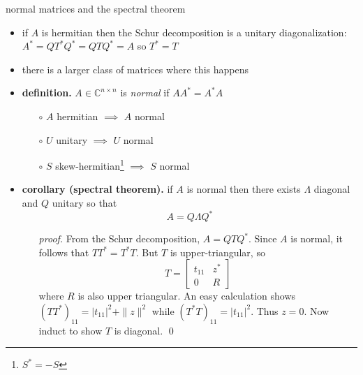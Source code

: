 \documentclass[10pt,hyperref]{beamer}
\newcommand{\CC}{\mathbb{C}}
\newcommand{\blocktwo}[4]{\left[\begin{array}{c|c} #1 & #2 \\ \hline #3 & #4 \end{array}\right]}
\newcommand{\bqed}{{\color{blue}\qed}}
\begin{document}
\begin{frame}{normal matrices and the spectral theorem}

\begin{itemize}
\item if $A$ is hermitian then the Schur decomposition is a unitary diagonalization: $A^* = Q T^* Q^* = Q T Q^* = A$ so $T^*=T$
\item there is a larger class of matrices where this happens
\item \textbf{definition.} $A\in \CC^{n\times n}$ is \emph{normal} if $AA^*=A^*A$
    \begin{itemize}
    \item[$\circ$] $A$ hermitian $\implies$ $A$ normal
    \item[$\circ$] $U$ unitary $\implies$ $U$ normal
    \item[$\circ$] $S$ skew-hermitian\footnote{\scriptsize $S^*=-S$} $\implies$ $S$ normal
    \end{itemize}
\item \textbf{corollary (spectral theorem).} if $A$ is normal then there exists $\Lambda$ diagonal and $Q$ unitary so that
    $$A=Q \Lambda Q^*$$

    \begin{itemize}
    \item[\emph{proof.}] From the Schur decomposition, $A=QTQ^*$.  Since $A$ is normal, it follows that $TT^*=T^*T$.  But $T$ is upper-triangular, so
    $$T = \blocktwo{t_{11}}{z^*}{0}{R}$$
where $R$ is also upper triangular.  An easy calculation shows $(TT^*)_{11} = |t_{11}|^2 + \|z\|^2$ while $(T^*T)_{11} = |t_{11}|^2$.  Thus $z=0$.  Now induct to show $T$ is diagonal. \bqed
    \end{itemize}
\end{itemize}
\end{frame}
\end{document}
